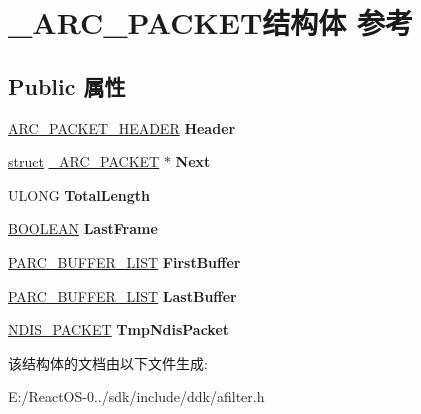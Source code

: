 \hypertarget{struct___a_r_c___p_a_c_k_e_t}{}\section{\+\_\+\+A\+R\+C\+\_\+\+P\+A\+C\+K\+E\+T结构体 参考}
\label{struct___a_r_c___p_a_c_k_e_t}
\subsection*{Public 属性}
\begin{DoxyCompactItemize}
\item 
\mbox{\label{struct___a_r_c___p_a_c_k_e_t_aa33d7a5eb8f47009d85ded90446230ab}} 
\hyperlink{struct___a_r_c___p_a_c_k_e_t___h_e_a_d_e_r}{A\+R\+C\+\_\+\+P\+A\+C\+K\+E\+T\+\_\+\+H\+E\+A\+D\+ER} {\bfseries Header}
\item 
\mbox{\label{struct___a_r_c___p_a_c_k_e_t_ac680e20b2a98c905751d1dc73ecd722e}} 
\hyperlink{interfacestruct}{struct} \hyperlink{struct___a_r_c___p_a_c_k_e_t}{\+\_\+\+A\+R\+C\+\_\+\+P\+A\+C\+K\+ET} $\ast$ {\bfseries Next}
\item 
\mbox{\label{struct___a_r_c___p_a_c_k_e_t_a5d854cf22d95eae0df065bd845e7388f}} 
U\+L\+O\+NG {\bfseries Total\+Length}
\item 
\mbox{\label{struct___a_r_c___p_a_c_k_e_t_a620e7dec6f7cb2ccc4a1ef27653068f7}} 
\hyperlink{_processor_bind_8h_a112e3146cb38b6ee95e64d85842e380a}{B\+O\+O\+L\+E\+AN} {\bfseries Last\+Frame}
\item 
\mbox{\label{struct___a_r_c___p_a_c_k_e_t_a01c6dea69a163094bb7cbf26dcef0470}} 
\hyperlink{struct___a_r_c___b_u_f_f_e_r___l_i_s_t}{P\+A\+R\+C\+\_\+\+B\+U\+F\+F\+E\+R\+\_\+\+L\+I\+ST} {\bfseries First\+Buffer}
\item 
\mbox{\label{struct___a_r_c___p_a_c_k_e_t_a972e03a1d113e7addb616f04e1f645da}} 
\hyperlink{struct___a_r_c___b_u_f_f_e_r___l_i_s_t}{P\+A\+R\+C\+\_\+\+B\+U\+F\+F\+E\+R\+\_\+\+L\+I\+ST} {\bfseries Last\+Buffer}
\item 
\mbox{\label{struct___a_r_c___p_a_c_k_e_t_a8dd04b6da84ee9998610354ec4321fe0}} 
\hyperlink{struct___n_d_i_s___p_a_c_k_e_t}{N\+D\+I\+S\+\_\+\+P\+A\+C\+K\+ET} {\bfseries Tmp\+Ndis\+Packet}
\end{DoxyCompactItemize}


该结构体的文档由以下文件生成\+:\begin{DoxyCompactItemize}
\item 
E\+:/\+React\+O\+S-\/0../sdk/include/ddk/afilter.\+h\end{DoxyCompactItemize}
